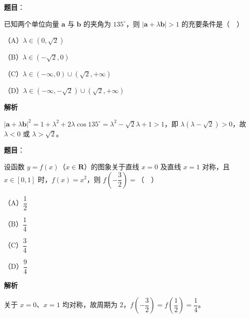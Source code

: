 \begin{answer}

\textbf{题目}：

已知两个单位向量 $\boldsymbol a$ 与 $\boldsymbol b$ 的夹角为 $135^\circ$，则 $|\boldsymbol a+\lambda\boldsymbol b|>1$ 的充要条件是（　）

（A）$\lambda\in(0,\sqrt2)$

（B）$\lambda\in(-\sqrt2,0)$

（C）$\lambda\in(-\infty,0)\cup(\sqrt2,+\infty)$

（D）$\lambda\in(-\infty,-\sqrt2)\cup(\sqrt2,+\infty)$

\textbf{解析}

$|\boldsymbol a+\lambda\boldsymbol b|^2=1+\lambda^2+2\lambda\cos135^\circ=\lambda^2-\sqrt2\lambda+1>1$，即 $\lambda(\lambda-\sqrt2)>0$，故 $\lambda<0$ 或 $\lambda>\sqrt2$。


\end{answer}
\begin{answer}

\textbf{题目}：

设函数 $y=f(x)$（$x\in\mathbf R$）的图象关于直线 $x=0$ 及直线 $x=1$ 对称，且 $x\in[0,1]$ 时，$f(x)=x^2$，则 $f\left(-\dfrac32\right)=$（　）

（A）$\dfrac12$

（B）$\dfrac14$

（C）$\dfrac34$

（D）$\dfrac94$

\textbf{解析}

关于 $x=0$、$x=1$ 均对称，故周期为 $2$，$f\left(-\dfrac32\right)=f\left(\dfrac12\right)=\dfrac14$。


\end{answer}
